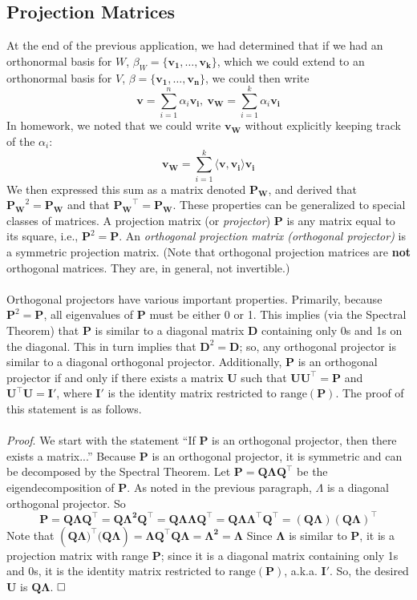 \documentclass{article}
\begin{document}
\subsection*{Projection Matrices}
At the end of the previous application, we had determined that if we had an orthonormal basis for $W$, $\beta_W = \{\mathbf{v_1}, \ldots, \mathbf{v_k}\}$, which we could extend to an orthonormal basis for $V$, $\beta = \{\mathbf{v_1}, \ldots, \mathbf{v_n}\}$, we could then write $$\mathbf{v} = \sum\limits_{i = 1}^n \alpha_i\mathbf{v_i},\ \mathbf{v_W} = \sum\limits_{i=1}^k \alpha_i\mathbf{v_i} $$ In homework, we noted that we could write $\mathbf{v_W}$ without explicitly keeping track of the $\alpha_i$: $$\mathbf{v_W} = \sum\limits_{i=1}^k \langle \mathbf{v}, \mathbf{v_i} \rangle \mathbf{v_i}$$ We then expressed this sum as a matrix denoted $\mathbf{P_W}$, and derived that $\mathbf{P_W}^2 = \mathbf{P_W}$ and that $\mathbf{P_W}^{\top} = \mathbf{P_W}$. These properties can be generalized to special classes of matrices. A projection matrix (or \textit{projector}) $\mathbf{P}$ is any matrix equal to its square, i.e., $\mathbf{P}^2 = \mathbf{P}$. An \textit{orthogonal projection matrix (orthogonal projector)} is a symmetric projection matrix. (Note that orthogonal projection matrices are \textbf{not} orthogonal matrices. They are, in general, not invertible.)\\\\
Orthogonal projectors have various important properties. Primarily, because $\mathbf{P}^2 = \mathbf{P}$, all eigenvalues of $\mathbf{P}$ must be either 0 or 1. This implies (via the Spectral Theorem) that $\mathbf{P}$ is similar to a diagonal matrix $\mathbf{D}$ containing only 0s and 1s on the diagonal. This in turn implies that $\mathbf{D}^2 = \mathbf{D}$; so, any orthogonal projector is similar to a diagonal orthogonal projector. Additionally, $\mathbf{P}$ is an orthogonal projector if and only if there exists a matrix $\mathbf{U}$ such that $\mathbf{UU^{\top}} = \mathbf{P}$ and $\mathbf{U^{\top}U} = \mathbf{I'}$, where $\mathbf{I'}$ is the identity matrix restricted to $\text{range}(\mathbf{P})$. The proof of this statement is as follows. \\\\
\textit{Proof}. We start with the statement ``If $\mathbf{P}$ is an orthogonal projector, then there exists a matrix...'' Because $\mathbf{P}$ is an orthogonal projector, it is symmetric and can be decomposed by the Spectral Theorem. Let $\mathbf{P} = \mathbf{Q\Lambda Q^{\top}}$ be the eigendecomposition of $\mathbf{P}$. As noted in the previous paragraph, $\Lambda$ is a diagonal orthogonal projector. So $$\mathbf{P} = \mathbf{Q\Lambda Q^{\top}} = \mathbf{Q\Lambda^2Q^{\top}} = \mathbf{Q\Lambda\Lambda Q^{\top}} = \mathbf{Q\Lambda\Lambda^{\top}Q^{\top}} = \mathbf{(Q\Lambda)(Q\Lambda)^{\top}}$$ Note that $(\mathbf{Q\Lambda)^{\top}(Q\Lambda}) = \mathbf{\Lambda Q^{\top}Q\Lambda} = \mathbf{\Lambda^2} = \mathbf{\Lambda}$ Since $\mathbf{\Lambda}$ is similar to $\mathbf{P}$, it is a projection matrix with range $\mathbf{P}$; since it is a diagonal matrix containing only 1s and 0s, it is the identity matrix restricted to $\text{range}(\mathbf{P})$, a.k.a. $\mathbf{I'}$. So, the desired $\mathbf{U}$ is $\mathbf{Q\Lambda}$. $\hfill\square$ \\
\end{document}
